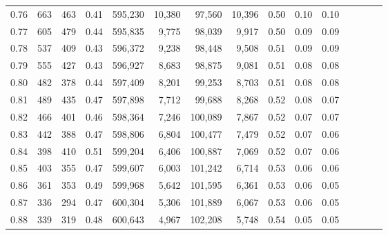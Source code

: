 \begin{tabular}{rrrcrrrrrrrrrrr}
0.76 &     663 &    463 &                                       0.41 &  595,230 &   10,380 &   97,560 &   10,396 &  0.50 &  0.10 &                         0.10 \\
0.77 &     605 &    479 &                                       0.44 &  595,835 &    9,775 &   98,039 &    9,917 &  0.50 &  0.09 &                         0.09 \\
0.78 &     537 &    409 &                                       0.43 &  596,372 &    9,238 &   98,448 &    9,508 &  0.51 &  0.09 &                         0.09 \\
0.79 &     555 &    427 &                                       0.43 &  596,927 &    8,683 &   98,875 &    9,081 &  0.51 &  0.08 &                         0.08 \\
0.80 &     482 &    378 &                                       0.44 &  597,409 &    8,201 &   99,253 &    8,703 &  0.51 &  0.08 &                         0.08 \\
0.81 &     489 &    435 &                                       0.47 &  597,898 &    7,712 &   99,688 &    8,268 &  0.52 &  0.08 &                         0.07 \\
0.82 &     466 &    401 &                                       0.46 &  598,364 &    7,246 &  100,089 &    7,867 &  0.52 &  0.07 &                         0.07 \\
0.83 &     442 &    388 &                                       0.47 &  598,806 &    6,804 &  100,477 &    7,479 &  0.52 &  0.07 &                         0.06 \\
0.84 &     398 &    410 &                                       0.51 &  599,204 &    6,406 &  100,887 &    7,069 &  0.52 &  0.07 &                         0.06 \\
0.85 &     403 &    355 &                                       0.47 &  599,607 &    6,003 &  101,242 &    6,714 &  0.53 &  0.06 &                         0.06 \\
0.86 &     361 &    353 &                                       0.49 &  599,968 &    5,642 &  101,595 &    6,361 &  0.53 &  0.06 &                         0.05 \\
0.87 &     336 &    294 &                                       0.47 &  600,304 &    5,306 &  101,889 &    6,067 &  0.53 &  0.06 &                         0.05 \\
0.88 &     339 &    319 &                                       0.48 &  600,643 &    4,967 &  102,208 &    5,748 &  0.54 &  0.05 &                         0.05 \\

\end{tabular}
